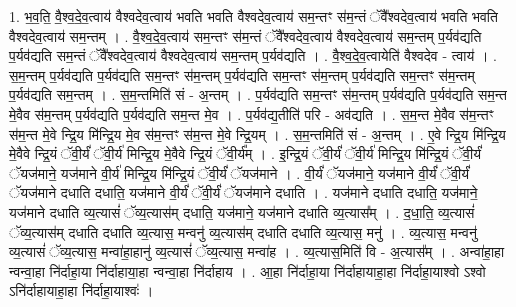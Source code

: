 \documentclass[17pt]{extarticle}
\begin{document}
1. भ॒व॒ति॒ वै॒श्व॒दे॒व॒त्वाय॑ वैश्वदेव॒त्वाय॑ भवति भवति वैश्वदेव॒त्वाय॑ सम॒न्तꣳ स॑म॒न्तं ॅवै᳚श्वदेव॒त्वाय॑ भवति भवति वैश्वदेव॒त्वाय॑ सम॒न्तम् । . वै॒श्व॒दे॒व॒त्वाय॑ सम॒न्तꣳ स॑म॒न्तं ॅवै᳚श्वदेव॒त्वाय॑ वैश्वदेव॒त्वाय॑ सम॒न्तम् प॒र्यव॑द्यति प॒र्यव॑द्यति सम॒न्तं ॅवै᳚श्वदेव॒त्वाय॑ वैश्वदेव॒त्वाय॑ सम॒न्तम् प॒र्यव॑द्यति । . वै॒श्व॒दे॒व॒त्वायेति॑ वैश्वदेव - त्वाय॑ । . स॒म॒न्तम् प॒र्यव॑द्यति प॒र्यव॑द्यति सम॒न्तꣳ स॑म॒न्तम् प॒र्यव॑द्यति सम॒न्तꣳ स॑म॒न्तम् प॒र्यव॑द्यति सम॒न्तꣳ स॑म॒न्तम् प॒र्यव॑द्यति सम॒न्तम् । . स॒म॒न्तमिति॑ सं - अ॒न्तम् । . प॒र्यव॑द्यति सम॒न्तꣳ स॑म॒न्तम् प॒र्यव॑द्यति प॒र्यव॑द्यति सम॒न्त मे॒वैव स॑म॒न्तम् प॒र्यव॑द्यति प॒र्यव॑द्यति सम॒न्त मे॒व । . प॒र्यव॑द्य॒तीति॑ परि - अव॑द्यति । . स॒म॒न्त मे॒वैव स॑म॒न्तꣳ स॑म॒न्त मे॒वे न्द्रि॒य मि॑न्द्रि॒य मे॒व स॑म॒न्तꣳ स॑म॒न्त मे॒वे न्द्रि॒यम् । . स॒म॒न्तमिति॑ सं - अ॒न्तम् । . ए॒वे न्द्रि॒य मि॑न्द्रि॒य मे॒वैवे न्द्रि॒यं ॅवी॒र्यं॑ ॅवी॒र्य॑ मिन्द्रि॒य मे॒वैवे न्द्रि॒यं ॅवी॒र्य᳚म् । . इ॒न्द्रि॒यं ॅवी॒र्यं॑ ॅवी॒र्य॑ मिन्द्रि॒य मि॑न्द्रि॒यं ॅवी॒र्यं॑ ॅयज॑माने॒ यज॑माने वी॒र्य॑ मिन्द्रि॒य मि॑न्द्रि॒यं ॅवी॒र्यं॑ ॅयज॑माने । . वी॒र्यं॑ ॅयज॑माने॒ यज॑माने वी॒र्यं॑ ॅवी॒र्यं॑ ॅयज॑माने दधाति दधाति॒ यज॑माने वी॒र्यं॑ ॅवी॒र्यं॑ ॅयज॑माने दधाति । . यज॑माने दधाति दधाति॒ यज॑माने॒ यज॑माने दधाति व्य॒त्यासं॑ ॅव्य॒त्यास॑म् दधाति॒ यज॑माने॒ यज॑माने दधाति व्य॒त्यास᳚म् । . द॒धा॒ति॒ व्य॒त्यासं॑ ॅव्य॒त्यास॑म् दधाति दधाति व्य॒त्यास॒ मन्वनु॑ व्य॒त्यास॑म् दधाति दधाति व्य॒त्यास॒ मनु॑ । . व्य॒त्यास॒ मन्वनु॑ व्य॒त्यासं॑ ॅव्य॒त्यास॒ मन्वा॑हा॒हानु॑ व्य॒त्यासं॑ ॅव्य॒त्यास॒ मन्वा॑ह । . व्य॒त्यास॒मिति॑ वि - अ॒त्यास᳚म् । . अन्वा॑हा॒हा न्वन्वा॒हा नि॑र्दाहा॒या नि॑र्दाहाया॒हा न्वन्वा॒हा नि॑र्दाहाय । . आ॒हा नि॑र्दाहा॒या नि॑र्दाहायाहा॒हा नि॑र्दाहा॒याश्वो ऽश्वो ऽनि॑र्दाहायाहा॒हा नि॑र्दाहा॒याश्वः॑ । \newline
\end{document}
